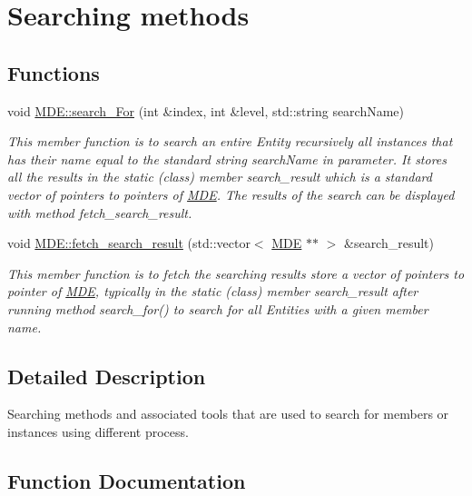 \hypertarget{group__group__search}{}\section{Searching methods}
\label{group__group__search}
\subsection*{Functions}
\begin{DoxyCompactItemize}
\item 
void \hyperlink{group__group__search_ga265f4aa5242e6380380067d659ada5c1}{M\+D\+E\+::search\+\_\+\+For} (int \&index, int \&level, std\+::string search\+Name)
\begin{DoxyCompactList}\small\item\em This member function is to search an entire Entity recursively all instances that has their name equal to the standard string search\+Name in parameter. It stores all the results in the static (class) member search\+\_\+result which is a standard vector of pointers to pointers of \hyperlink{classMDE}{M\+DE}. The results of the search can be displayed with method fetch\+\_\+search\+\_\+result. \end{DoxyCompactList}\item 
void \hyperlink{group__group__search_gaa7a2d3a12f120684e389e8d045b6bf24}{M\+D\+E\+::fetch\+\_\+search\+\_\+result} (std\+::vector$<$ \hyperlink{classMDE}{M\+DE} $\ast$$\ast$ $>$ \&search\+\_\+result)
\begin{DoxyCompactList}\small\item\em This member function is to fetch the searching results store a vector of pointers to pointer of \hyperlink{classMDE}{M\+DE}, typically in the static (class) member search\+\_\+result after running method search\+\_\+for() to search for all Entities with a given member \textquotesingle{}name\textquotesingle{}. \end{DoxyCompactList}\end{DoxyCompactItemize}


\subsection{Detailed Description}
Searching methods and associated tools that are used to search for members or instances using different process. 

\subsection{Function Documentation}
